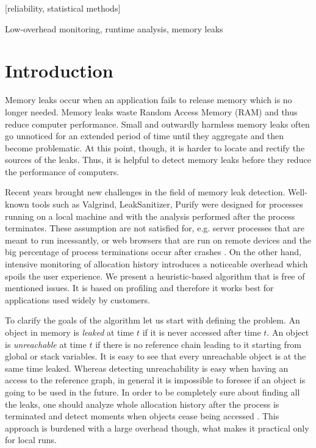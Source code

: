 \documentclass[preprint, numbers]{sigplanconf}
\newcommand{\todo}[1]{{\color{red}{(TODO: #1)}}}
\begin{document}
[reliability, statistical methods]

\terms

\keywords
Low-overhead monitoring, runtime analysis, memory leaks

\section{Introduction}

Memory leaks occur when an application fails to release memory which is no longer needed.
Memory leaks waste Random Access Memory (RAM) and thus reduce computer performance.
Small and outwardly harmless memory leaks often go unnoticed for an extended period
of time until they aggregate and then become problematic.
At this point, though, it is harder to locate and rectify the sources of the leaks.
Thus, it is helpful to detect memory leaks before they reduce the performance of computers.

Recent years brought new challenges in the field of memory leak detection.
Well-known tools such as Valgrind, LeakSanitizer, Purify \cite{valgrind, leak-san, purify} were designed
for processes running on a local machine and with the analysis
performed after the process terminates.
These assumption are not satisfied for, e.g. server processes
that are meant to run incessantly, or web browsers that are run
on remote devices and the big percentage of process terminations
occur after crashes \todo{how much? cite?}.
On the other hand, intensive monitoring of allocation history
introduces a noticeable overhead which spoils the user experience.
We present a heuristic-based algorithm that is free of mentioned issues.
It is based on profiling and therefore it works best for applications used widely
by customers.

To clarify the goals of the algorithm let us start with defining the problem.
An object in memory is \textit{leaked} at time $t$ if it is never accessed
after time $t$.
An object is \textit{unreachable} at time $t$ if there is no reference chain
leading to it starting from global or stack variables.
It is easy to see that every unreachable object is at the same time leaked.
Whereas detecting unreachability is easy when having an access to the reference graph,
in general it is impossible to foresee if an object is going to be used in the future.
In order to be completely sure about finding all the leaks, one should analyze whole
allocation history after the process is terminated and detect moments when objects cease being accessed
\todo{any profiler working like this?}.
This approach is burdened with a large overhead though, what makes it practical only
for local runs.
\end{document}
